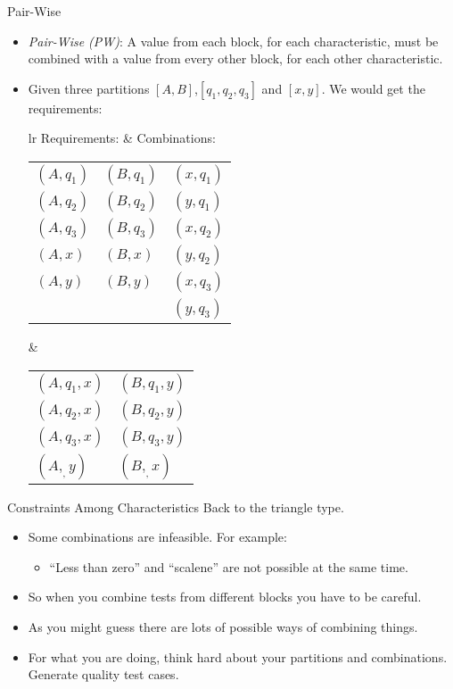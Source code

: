 \documentclass{beamer}
\begin{document}
\begin{frame}{Pair-Wise}
  \begin{itemize}
  \item {\em Pair-Wise (PW)}: A value from each block, for each
    characteristic, must be combined with a value from every other
    block, for each other characteristic.
  \item Given three partitions  $[A,B]$,$[q_1,q_2,q_3]$ and
    $[x,y]$. We would get the requirements:

{\small
\vspace{2mm}
\begin{tabular}{lr}
\vspace{2mm}
  {\large Requirements:} & {\large Combinations:} \\
    \begin{tabular}{lll}
      $(A,q_1)$ & $(B,q_1)$ & $(x,q_1)$ \\
      $(A,q_2)$ & $(B,q_2)$ & $(y,q_1)$ \\
      $(A,q_3)$ & $(B,q_3)$ & $(x,q_2)$ \\
      $(A,x)$  & $(B,x)$   & $(y,q_2)$ \\
      $(A,y)$  & $(B,y)$   & $(x,q_3)$ \\
               &           & $(y,q_3)$
    \end{tabular}
&  
\begin{tabular}{ll}
  $(A,q_1,x)$ & $(B,q_1,y)$ \\
  $(A,q_2,x)$ & $(B,q_2,y)$ \\
  $(A,q_3,x)$ & $(B,q_3,y)$ \\
  $(A,_,y)$ & $(B,_,x)$ 
\end{tabular}
\end{tabular}
}
  \end{itemize}
\end{frame}
\begin{frame}{Constraints Among Characteristics}
  Back to the triangle type.
  \begin{itemize}
  \item Some combinations are infeasible. For example:
    \begin{itemize}
    \item ``Less than zero'' and ``scalene'' are not possible at the same time.
    \end{itemize}
  \item So when you combine tests from different blocks you have to be
    careful.
  \item As you might guess there are lots of possible ways of combining
    things.
    \item For what you are doing, think hard about your partitions and
      combinations. Generate quality test cases.
      
  \end{itemize}

  
\end{frame}
\end{document}
